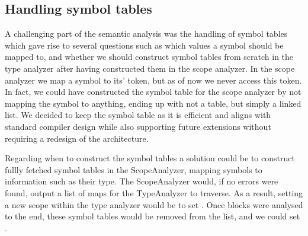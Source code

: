\subsection{Handling symbol tables}
A challenging part of the semantic analysis was the handling of symbol tables which gave rise to several questions such as
which values a symbol should be mapped to, and whether we should construct symbol tables from scratch in the type analyzer after having constructed them in the scope analyzer.
In the scope analyzer we map a symbol to its' token, but as of now we never access this token. In fact, we could have constructed the symbol table for the scope analyzer
by not mapping the symbol to anything, ending up with not a table, but simply a linked list.
We decided to keep the symbol table as it is efficient and aligns with standard compiler design while also supporting future extensions without requiring a redesign of the architecture.

Regarding when to construct the symbol tables a solution could be to construct fullly fetched symbol tables in the ScopeAnalyzer, mapping symbols to information such as their type.
The ScopeAnalyzer would, if no errors were found, output a list of maps for the TypeAnalyzer to traverse. 
As a result, setting a new scope within the type analyzer would be to set .
Once blocks were analysed to the end, these symbol tables would be removed from the list, and we could set .

